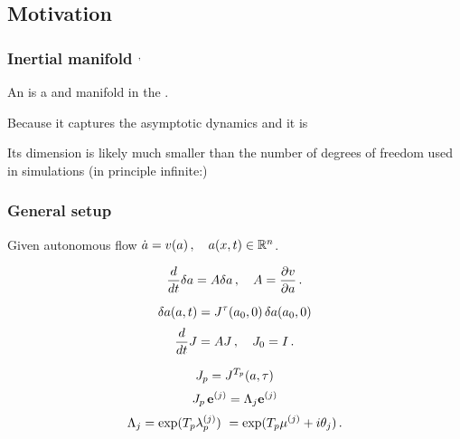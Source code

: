 \subsection{Motivation}

\begin{frame}
  \frametitle{Inertial manifold
    $^,$
  }

  An  is a  and
   manifold in the \statesp.

  \vfill


  \pause
  \vfill

  Because it captures the asymptotic dynamics and it is 

  \vfill

  Its dimension is likely much smaller than the
  number of degrees of freedom used in simulations (in principle infinite:)

\end{frame}

\begin{frame}
  \frametitle{General setup}

  Given autonomous flow $\dot{a} = v(a) \,, \quad a(x, t) \in \mathbb{R}^n$.

  \begin{equation}
    \label{eq:stab}
    \frac{d}{dt}\delta \ssp = A \delta\ssp \,, \quad
    A = \frac{\partial \vel}{\partial \ssp}
    \,.
  \end{equation}

  \begin{equation}
    \label{eq:jacob}
    \delta \ssp(\ssp, t)=\jMps^\zeit(\ssp_0, 0)\,\delta \ssp(\ssp_0, 0)
  \end{equation}
  \begin{equation}
    \label{eq:tangentDynamics}
    \frac{d}{dt}\jMps = A \jMps \,, \quad
    J_0 = I
    \,.
  \end{equation}

  \pause

  \begin{equation}
    \label{eq:fm}
    \jMps_p=\jMps^{\period{p}}(\ssp, \zeit)
  \end{equation}
  \begin{equation}
    \label{eq:fv}
    \jMps_p\,\jEigvec[j]=\ExpaEig_{j}\jEigvec[j]
  \end{equation}
  \[
    \ExpaEig_{j} = \exp(\period{p}\Lyap^{(j)}_p)\
    = \exp(\period{p}\eigRe[j] + i\theta_j)
    \,.
  \]

\end{frame}

